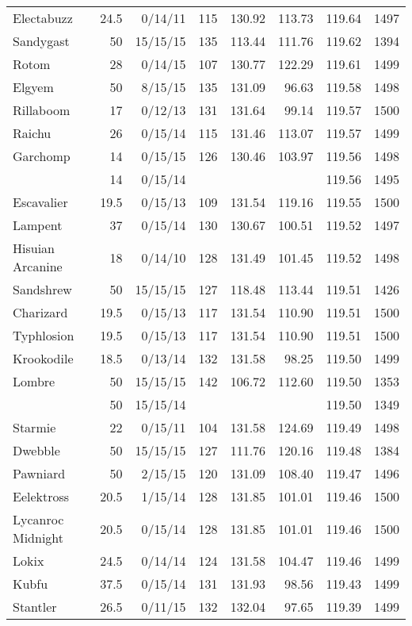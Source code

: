 \begin{longtable}{lrrrrrrr}
Electabuzz & 24.5 & 0/14/11 & 115 & 130.92 & 113.73 & 119.64 & 1497\\
Sandygast & 50 & 15/15/15 & 135 & 113.44 & 111.76 & 119.62 & 1394\\
Rotom & 28 & 0/14/15 & 107 & 130.77 & 122.29 & 119.61 & 1499\\
Elgyem & 50 & 8/15/15 & 135 & 131.09 & 96.63 & 119.58 & 1498\\
Rillaboom & 17 & 0/12/13 & 131 & 131.64 & 99.14 & 119.57 & 1500\\
Raichu & 26 & 0/15/14 & 115 & 131.46 & 113.07 & 119.57 & 1499\\
Garchomp & 14 & 0/15/15 & 126 & 130.46 & 103.97 & 119.56 & 1498\\
 & 14 & 0/15/14 & & & & 119.56 & 1495\\
Escavalier & 19.5 & 0/15/13 & 109 & 131.54 & 119.16 & 119.55 & 1500\\
Lampent & 37 & 0/15/14 & 130 & 130.67 & 100.51 & 119.52 & 1497\\
Hisuian Arcanine & 18 & 0/14/10 & 128 & 131.49 & 101.45 & 119.52 & 1498\\
Sandshrew & 50 & 15/15/15 & 127 & 118.48 & 113.44 & 119.51 & 1426\\
Charizard & 19.5 & 0/15/13 & 117 & 131.54 & 110.90 & 119.51 & 1500\\
Typhlosion & 19.5 & 0/15/13 & 117 & 131.54 & 110.90 & 119.51 & 1500\\
Krookodile & 18.5 & 0/13/14 & 132 & 131.58 & 98.25 & 119.50 & 1499\\
Lombre & 50 & 15/15/15 & 142 & 106.72 & 112.60 & 119.50 & 1353\\
 & 50 & 15/15/14 & & & & 119.50 & 1349\\
Starmie & 22 & 0/15/11 & 104 & 131.58 & 124.69 & 119.49 & 1498\\
Dwebble & 50 & 15/15/15 & 127 & 111.76 & 120.16 & 119.48 & 1384\\
Pawniard & 50 & 2/15/15 & 120 & 131.09 & 108.40 & 119.47 & 1496\\
Eelektross & 20.5 & 1/15/14 & 128 & 131.85 & 101.01 & 119.46 & 1500\\
Lycanroc Midnight & 20.5 & 0/15/14 & 128 & 131.85 & 101.01 & 119.46 & 1500\\
Lokix & 24.5 & 0/14/14 & 124 & 131.58 & 104.47 & 119.46 & 1499\\
Kubfu & 37.5 & 0/15/14 & 131 & 131.93 & 98.56 & 119.43 & 1499\\
Stantler & 26.5 & 0/11/15 & 132 & 132.04 & 97.65 & 119.39 & 1499\\

\end{longtable}
